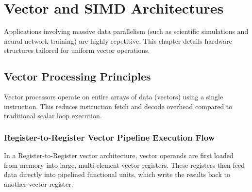 \documentclass[12pt,a4paper,openany]{book}
\begin{document}
\chapter{Vector and SIMD Architectures}

Applications involving massive data parallelism (such as scientific simulations and neural network training) are highly repetitive. This chapter details hardware structures tailored for uniform vector operations.

\section{Vector Processing Principles}
Vector processors operate on entire arrays of data (vectors) using a single instruction. This reduces instruction fetch and decode overhead compared to traditional scalar loop execution.

\subsection{Register-to-Register Vector Pipeline Execution Flow}
In a Register-to-Register vector architecture, vector operands are first loaded from memory into large, multi-element vector registers. These registers then feed data directly into pipelined functional units, which write the results back to another vector register.
\end{document}
